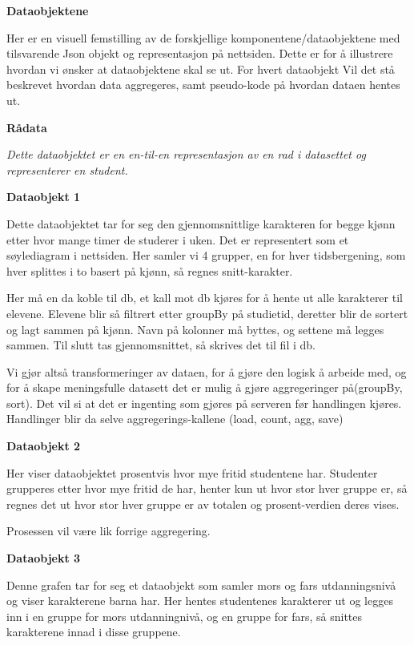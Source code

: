 \textbf{Dataobjektene}

Her er en visuell femstilling av de forskjellige komponentene/dataobjektene med tilsvarende Json objekt og representasjon på nettsiden. Dette er for å illustrere hvordan vi ønsker at dataobjektene skal se ut. For hvert dataobjekt Vil det stå beskrevet hvordan data aggregeres, samt pseudo-kode på hvordan dataen hentes ut.

\textbf{Rådata}

\textit{Dette dataobjektet er en en-til-en representasjon av en rad i datasettet og representerer en student.}

\textbf{Dataobjekt 1}


Dette dataobjektet tar for seg den gjennomsnittlige karakteren for begge kjønn etter hvor mange timer de studerer i uken. Det er representert som et søylediagram i nettsiden. Her samler vi 4 grupper, en for hver tidsbergening, som hver splittes i to basert på kjønn, så regnes snitt-karakter.

Her må en da koble til db, et kall mot db kjøres for å hente ut alle karakterer til elevene. Elevene blir så filtrert etter groupBy på studietid, deretter blir de sortert og lagt sammen på kjønn. Navn på kolonner må byttes, og settene må legges sammen. Til slutt tas gjennomsnittet, så skrives det til fil i db.

Vi gjør altså transformeringer av dataen, for å gjøre den logisk å arbeide med, og for å skape meningsfulle datasett det er mulig å gjøre aggregeringer på(groupBy, sort). Det vil si at det er ingenting som gjøres på serveren før handlingen kjøres. Handlinger blir da selve aggregerings-kallene (load, count, agg, save)


\textbf{Dataobjekt 2}


Her viser dataobjektet prosentvis hvor mye fritid studentene har. Studenter grupperes etter hvor mye fritid de har, henter kun ut hvor stor hver gruppe er, så regnes 
det ut hvor stor hver gruppe er av totalen og prosent-verdien deres vises.

Prosessen vil være lik forrige aggregering.

\textbf{Dataobjekt 3}


Denne grafen tar for seg et dataobjekt som samler mors og fars utdanningsnivå og viser karakterene barna har. Her hentes studentenes karakterer ut og legges inn i en gruppe for mors utdanningnivå, og en gruppe for fars, så snittes karakterene innad i disse gruppene.

